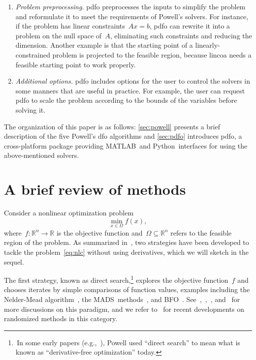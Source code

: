 \documentclass[11pt,draft]{article}
\numberwithin{equation}{section}
\newcommand{\R}{\mathbb{R}}
\newcommand{\fset}{\Omega}
\newcommand{\obj}{f}
\def\bfo{\mbox{BFO}}
\def\mads{\mbox{MADS}}
\def\matlab{\mbox{MATLAB}}
\def\python{\mbox{Python}}
\begin{document}
\begin{enumerate}
    \item \emph{Problem preprocessing.}
    \gls{pdfo} preprocesses the inputs to simplify the problem and reformulate it to meet the requirements of Powell's solvers.
    For instance, if the problem has linear constraints~$A x = b$, \gls{pdfo} can rewrite it into a problem on the null space of~$A$, eliminating such constraints and reducing the dimension.
    Another example is that the starting point of a linearly-constrained problem is projected to the feasible region, because \gls{lincoa} needs a feasible starting point to work properly.

    \item \emph{Additional options.}
    \gls{pdfo} includes options for the user to control the solvers in some manners that are useful in practice.
    For example, the user can request \gls{pdfo} to scale the problem according to the bounds of the variables before solving it.

\end{enumerate}

The organization of this paper is as follows: \cref{sec:powell} presents a brief description of the five Powell's \gls{dfo} algorithms and \cref{sec:pdfo} introduces \gls{pdfo}, a cross-platform package providing \matlab\ and \python\ interfaces for using the above-mentioned solvers.

\section{A brief review of  methods}

Consider a nonlinear optimization problem
\begin{equation}
    \label{eq:nlc}
    \min_{x \in \fset} \obj(x),
\end{equation}
where~$\obj \colon \R^n \to \R$ is the objective function and~$\fset \subseteq \R^n$ refers to the feasible region of the problem.
As summarized in~\cite{Conn_Scheinberg_Vicente_2009b}, two strategies have been developed to tackle the problem~\eqref{eq:nlc} without using derivatives, which we will sketch in the sequel.

The first strategy, known as direct search,\footnote{\,In some early papers
(e.g.,~\cite{Powell_1994,Powell_1998}), Powell used \enquote{direct search} to mean what is known as
\enquote{derivative-free optimization} today.} explores the objective function~$\obj$ and chooses iterates by simple comparisons of function values, examples including the Nelder-Mead algorithm~\cite{Nelder_Mead_1965}, the \mads\ methods~\cite{Audet_Dennis_2006,Abramson_Audet_2006,Digabel_2011}, and \bfo~\cite{Porcelli_Toint_2017,Porcelli_Toint_2020,Porcelli_Toint_2022}.
See~\cite{Kolda_Lewis_Torczon_2003},~\cite[Chapters~7 and~8]{Conn_Scheinberg_Vicente_2009b},~\cite[Part~3]{Audet_Hare_2017}, and~\cite[Section~2.1]{Larson_Menickelly_Wild_2019} for more discussions on this paradigm, and we refer to~\cite{Gratton_Etal_2015,Gratton_Etal_2019} for recent developments on randomized methods in this category.
\end{document}
